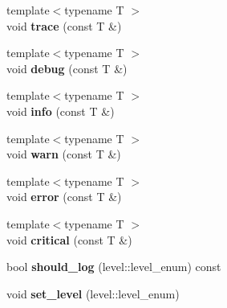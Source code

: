 \begin{DoxyCompactItemize}
\item 
{\footnotesize template$<$typename T $>$ }\\void {\bfseries trace} (const T \&)\hypertarget{classspdlog_1_1logger_a8d0c37f6eb65405b7dcfc7e7d60e6e58}{}\label{classspdlog_1_1logger_a8d0c37f6eb65405b7dcfc7e7d60e6e58}

\item 
{\footnotesize template$<$typename T $>$ }\\void {\bfseries debug} (const T \&)\hypertarget{classspdlog_1_1logger_ab46aca3267a2f2c4bfc25834067527e0}{}\label{classspdlog_1_1logger_ab46aca3267a2f2c4bfc25834067527e0}

\item 
{\footnotesize template$<$typename T $>$ }\\void {\bfseries info} (const T \&)\hypertarget{classspdlog_1_1logger_af002a28bd29ef0f798ca67191419b129}{}\label{classspdlog_1_1logger_af002a28bd29ef0f798ca67191419b129}

\item 
{\footnotesize template$<$typename T $>$ }\\void {\bfseries warn} (const T \&)\hypertarget{classspdlog_1_1logger_a7b4abd6d315181b2421e89f0efe71743}{}\label{classspdlog_1_1logger_a7b4abd6d315181b2421e89f0efe71743}

\item 
{\footnotesize template$<$typename T $>$ }\\void {\bfseries error} (const T \&)\hypertarget{classspdlog_1_1logger_aa91ef7020d423cf399fb54ae7800964f}{}\label{classspdlog_1_1logger_aa91ef7020d423cf399fb54ae7800964f}

\item 
{\footnotesize template$<$typename T $>$ }\\void {\bfseries critical} (const T \&)\hypertarget{classspdlog_1_1logger_a3102470f39f6d84e083e62d9c336fecd}{}\label{classspdlog_1_1logger_a3102470f39f6d84e083e62d9c336fecd}

\item 
bool {\bfseries should\+\_\+log} (level\+::level\+\_\+enum) const \hypertarget{classspdlog_1_1logger_a6c0941a0897874e3c7c3cc77edafa13e}{}\label{classspdlog_1_1logger_a6c0941a0897874e3c7c3cc77edafa13e}

\item 
void {\bfseries set\+\_\+level} (level\+::level\+\_\+enum)\hypertarget{classspdlog_1_1logger_afa83b0334d1599dd148f14ed4b8bae9f}{}\label{classspdlog_1_1logger_afa83b0334d1599dd148f14ed4b8bae9f}


\end{DoxyCompactItemize}
